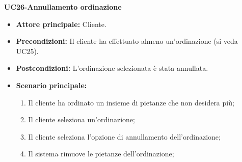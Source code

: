 \textbf{UC26-Annullamento ordinazione}
\begin{itemize}
\item \textbf{Attore principale:} Cliente.
\item \textbf{Precondizioni:} Il cliente ha effettuato almeno un'ordinazione (si veda UC25).
\item \textbf{Postcondizioni:} L'ordinazione selezionata è stata annullata.
\item \textbf{Scenario principale:}
\begin{enumerate}
    \item Il cliente ha ordinato un insieme di pietanze che non desidera più;
    \item Il cliente seleziona un'ordinazione;
    \item Il cliente seleziona l'opzione di annullamento dell'ordinazione;
    \item Il sistema rimuove le pietanze dell'ordinazione;
\end{enumerate}
\end{itemize}
